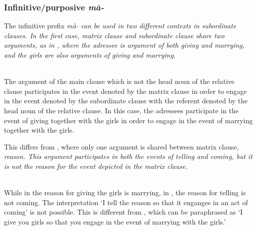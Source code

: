 \subsubsection{Infinitive/purposive \em mà-\em}\label{sec:cls:ma}

The infinitive prefix \em mà- \em can be used in two different contexts in subordinate clauses. In the first case, matrix clause and subordinate clause share two arguments, as in , where the adressee is argument of both giving and marrying, and the girls are also arguments of giving and marrying.



 \\
The argument of the main clause which is not the head noun of the relative clause participates in the event denoted by the matrix clause in order to engage in the event denoted by the subordinate clause with the referent denoted by the head noun of the relative clause. In this case, the adressees participate in the event of giving together with the girls in order to engage in the event of marrying together with the girls.

This differs from , where only one argument is shared between matrix clause, \em reason\em. This argument participates in both the events of telling and coming, but it is not the reason for the event depicted in the matrix clause.

\\

While in  the reason for giving the girls is marrying, in , the reason for telling is not coming. The interpretation `I tell the reason so that it enganges in an act of coming' is not possible. This is different from , which can be paraphrased as `I give you girls so that you engage in the event of marrying with the girls.'

